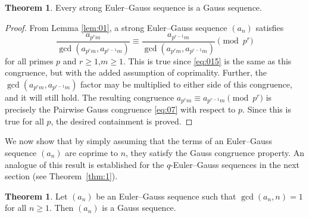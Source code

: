 \documentclass{article}
\numberwithin{equation}{section}
\theoremstyle{definition}
\newtheorem{theorem}[definition]{\bf {Theorem}}
\begin{document}
\begin{theorem}\label{thm:strongEG}
    Every strong Euler–Gauss sequence is a Gauss sequence. 
\end{theorem}

\begin{proof}
    From Lemma \ref{lem:01}, a strong Euler--Gauss sequence $(a_n)$
    satisfies \[\frac{a_{p^rm}}{\gcd(a_{p^rm},a_{p^{r-1}m})}\equiv\frac{a_{p^{r-1}m}}{\gcd(a_{p^rm},a_{p^{r-1}m})}\pmod{p^r}\]
    for all primes $p$ and $r\geq1$,$m\geq1$. This is true since \eqref{eq:015} is the same as this congruence, but with the added assumption of coprimality. Further, the $\gcd(a_{p^rm}, a_{p^{r-1}m})$ factor may be multiplied to either side of this congruence, and it will still hold. The resulting congruence $a_{p^rm}\equiv a_{p^{r-1}m}\pmod{p^r}$ is precisely the Pairwise Gauss congruence \eqref{eq:07} with respect to $p$. Since this is true for all $p$, the desired containment is proved.
 
\end{proof}
We now show that by simply assuming that the terms of an Euler--Gauss sequence $(a_n)$ are coprime to $n$, they satisfy the Gauss congruence property. An analogue of this result is established for the $q$-Euler--Gauss sequences in the next section (see Theorem~\ref{thm:1}). 
\begin{theorem}
    Let $(a_n)$ be an Euler--Gauss sequence such that $\gcd(a_n,n)=1$ for all $n\geq1$. Then $(a_n)$ is a Gauss sequence.
\end{theorem}
\end{document}
